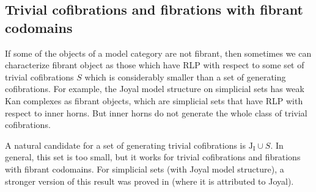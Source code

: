 \documentclass{tac}
\theoremstyle{definition}
\newcommand{\I}{\mathrm{I}}
\newcommand{\J}{\mathrm{J}}
\begin{document}
\subsection{Trivial cofibrations and fibrations with fibrant codomains}

If some of the objects of a model category are not fibrant, then sometimes we can characterize fibrant object as those which have
RLP with respect to some set of trivial cofibrations $S$ which is considerably smaller than a set of generating cofibrations.
For example, the Joyal model structure on simplicial sets has weak Kan complexes as fibrant objects,
which are simplicial sets that have RLP with respect to inner horns.
But inner horns do not generate the whole class of trivial cofibrations.

A natural candidate for a set of generating trivial cofibrations is $\J_\I \cup S$.
In general, this set is too small, but it works for trivial cofibrations and fibrations with fibrant codomains.
For simplicial sets (with Joyal model structure), a stronger version of this result was proved in \cite{lurie-topos} (where it is attributed to Joyal).
\end{document}
